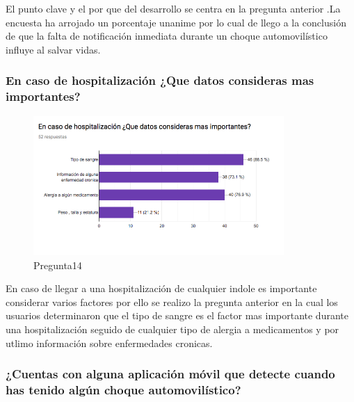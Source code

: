 El punto clave y el por que del desarrollo se centra en la pregunta anterior .La encuesta ha arrojado un porcentaje unanime por lo cual de llego a la conclusión de que la falta de notificación inmediata durante un choque automovilístico influye al salvar vidas.\\

\subsubsection{En caso de hospitalización ¿Que datos consideras mas importantes?}

\begin{figure}[htbp!]
	\begin{center}
		\includegraphics[width=0.85\textwidth]{DisenoEstructura/imagenes/Pregunta14}
		\caption{Pregunta14}
		\label{DE/FO/Pregunta14}
	\end{center}
\end{figure}

En caso de llegar a una hospitalización de cualquier indole es importante considerar varios factores por ello se realizo la pregunta anterior en la cual los usuarios determinaron que el tipo de sangre es el factor mas importante durante una hospitalización seguido de cualquier tipo de alergia a medicamentos y por utlimo información sobre enfermedades cronicas. \\

\subsubsection{¿Cuentas con alguna aplicación móvil que detecte cuando has tenido algún choque automovilístico?}


